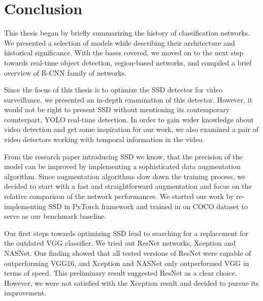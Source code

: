 \chapter*{Conclusion}
This thesis began by briefly summarizing the history of classification networks. We presented a selection of models while describing their architecture and historical significance. With the bases covered, we moved on to the next step towards real-time object detection, region-based networks, and compiled a brief overview of R-CNN family of networks.

Since the focus of this thesis is to optimize the SSD detector for video surveillance, we presented an in-depth examination of this detector. However, it would not be right to present SSD without mentioning its contemporary counterpart, YOLO real-time detection. In order to gain wider knowledge about video detection and get some inspiration for our work, we also examined a pair of video detectors working with temporal information in the video.

From the research paper introducing SSD we know, that the precision of the model can be improved by implementing a sophisticated data augmentation algorithm. Since augmentation algorithms slow down the training process, we decided to start with a fast and straightforward augmentation and focus on the relative comparison of the network performances. We started our work by re-implementing SSD in PyTorch framework and trained in on COCO dataset to serve as our benchmark baseline. 

Our first steps towards optimizing SSD lead to searching for a replacement for the outdated VGG classifier. We tried out ResNet networks, Xception and NASNet. Our finding showed that all tested versions of ResNet were capable of outperforming VGG16, and Xception and NASNet only outperformed VGG in terms of speed. This preliminary result suggested ResNet as a clear choice. However, we were not satisfied with the Xception result and decided to pursue its improvement. 

